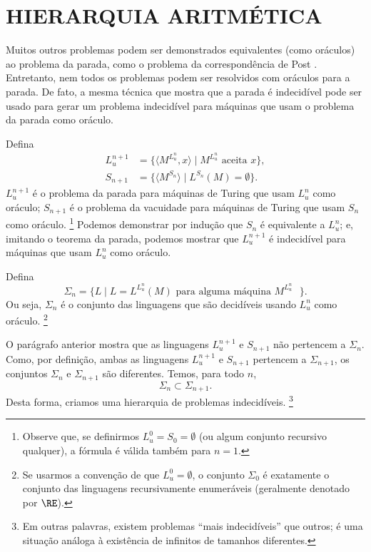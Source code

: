 \section{HIERARQUIA ARITMÉTICA}
\label{sec:arithmetical_hierarchy}

Muitos outros problemas podem ser demonstrados equivalentes
(como oráculos)
ao problema da parada,
como o problema da correspondência de Post \cite[p.~214]{HopcroftUllman1979}.
Entretanto,
nem todos os problemas podem ser resolvidos com oráculos para a parada.
De fato, a mesma técnica que mostra que a parada é indecidível
pode ser usado para gerar um problema indecidível
para máquinas que usam o problema da parada como oráculo.

Defina
\begin{align*}
    L_u^{n+1} &= \{ \langle M^{L_u^n}, x \rangle \mid M^{L_u^n} \text{ aceita } x \}, \\
    S_{n+1} &= \{ \langle M^{S_n} \rangle \mid L^{S_n}(M) = \emptyset \}.
\end{align*}
$L_u^{n+1}$ é o problema da parada
para máquinas de Turing que usam $L_u^n$ como oráculo;
$S_{n+1}$ é o problema da vacuidade
para máquinas de Turing que usam $S_n$ como oráculo.%
\footnote{
    Observe que,
    se definirmos $L_u^0 = S_0 = \emptyset$
    (ou algum conjunto recursivo qualquer),
    a fórmula é válida também para $n = 1$.
}
Podemos demonstrar por indução que $S_n$ é equivalente a $L_u^n$;
e, imitando o teorema da parada,
podemos mostrar que $L_u^{n+1}$ é indecidível para máquinas que usam $L_u^n$ como oráculo.

Defina
\begin{equation*}
    \Sigma_n = \{ L \mid L = L^{L_u^n}(M) \text{ para alguma máquina $M^{L_u^n}$ } \}.
\end{equation*}
Ou seja, $\Sigma_n$ é o conjunto das linguagens
que são decidíveis usando $L_u^n$ como oráculo.%
\footnote{
    Se usarmos a convenção de que $L_u^0 = \emptyset$,
    o conjunto $\Sigma_0$ é exatamente
    o conjunto das linguagens recursivamente enumeráveis
    (geralmente denotado por $\RE$).
}

O parágrafo anterior mostra que as linguagens $L_u^{n+1}$ e $S_{n+1}$
não pertencem a $\Sigma_n$.
Como, por definição,
ambas as linguagens $L_u^{n+1}$ e $S_{n+1}$ pertencem a $\Sigma_{n+1}$,
os conjuntos $\Sigma_n$ e $\Sigma_{n+1}$ são diferentes.
Temos, para todo $n$,
\begin{equation*}
    \Sigma_n \subset \Sigma_{n+1}.
\end{equation*}
Desta forma,
criamos uma hierarquia de problemas indecidíveis.%
\footnote{
    Em outras palavras,
    existem problemas ``mais indecidíveis'' que outros;
    é uma situação análoga à existência de infinitos de tamanhos diferentes.
}

